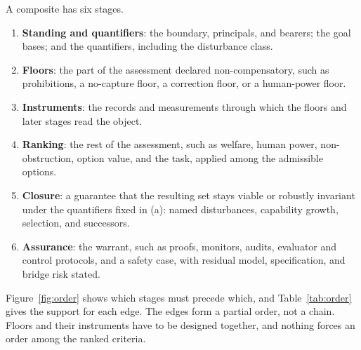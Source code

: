\documentclass[11pt]{article}
\begin{document}
A composite has six stages.
\begin{enumerate}[leftmargin=1.5em,label=(\alph*),itemsep=0pt]
  \item \textbf{Standing and quantifiers}: the boundary, principals, and bearers; the goal bases; and the quantifiers, including the disturbance class.
  \item \textbf{Floors}: the part of the assessment declared non-compensatory, such as prohibitions, a no-capture floor, a correction floor, or a human-power floor.
  \item \textbf{Instruments}: the records and measurements through which the floors and later stages read the object.
  \item \textbf{Ranking}: the rest of the assessment, such as welfare, human power, non-obstruction, option value, and the task, applied among the admissible options.
  \item \textbf{Closure}: a guarantee that the resulting set stays viable or robustly invariant under the quantifiers fixed in (a): named disturbances, capability growth, selection, and successors.
  \item \textbf{Assurance}: the warrant, such as proofs, monitors, audits, evaluator and control protocols, and a safety case, with residual model, specification, and bridge risk stated.
\end{enumerate}
Figure~\ref{fig:order} shows which stages must precede which, and Table~\ref{tab:order} gives the support for each edge.
The edges form a partial order, not a chain.
Floors and their instruments have to be designed together, and nothing forces an order among the ranked criteria.
\end{document}
